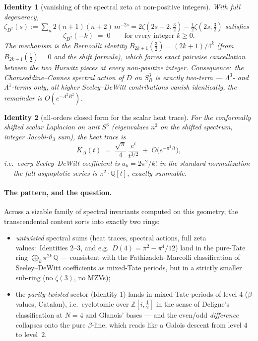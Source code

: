 \documentclass[11pt]{article}
\newtheorem{identity}{Identity}
\newcommand{\Q}{\mathbb{Q}}
\newcommand{\Z}{\mathbb{Z}}
\begin{document}
\begin{identity}[vanishing of the spectral zeta at non-positive
integers]
With full degeneracy, $\zeta_{D^2}(s) := \sum_{n} 2(n+1)(n+2)\,
m^{-2s} = 2\zeta(2s{-}2, \tfrac32) - \tfrac12 \zeta(2s, \tfrac32)$
satisfies
\begin{equation*}
  \zeta_{D^2}(-k) \;=\; 0 \qquad \text{for every integer } k \ge 0.
\end{equation*}
The mechanism is the Bernoulli identity $B_{2k+1}(\tfrac32) =
(2k{+}1)/4^k$ (from $B_{2k+1}(\tfrac12) = 0$ and the shift formula),
which forces exact pairwise cancellation between the two Hurwitz
pieces at every non-positive integer. Consequence:\ the
Chamseddine--Connes spectral action of $D$ on $S^3_R$ is
\emph{exactly two-term} --- $\Lambda^3$- and $\Lambda^1$-terms only,
all higher Seeley--DeWitt contributions vanish identically, the
remainder is $O(e^{-\Lambda^2 R^2})$.
\end{identity}

\begin{identity}[all-orders closed form for the scalar heat trace]
For the conformally shifted scalar Laplacian on unit $S^3$
(eigenvalues $n^2$ on the shifted spectrum, integer Jacobi-$\vartheta_3$
sum), the heat trace is
\begin{equation*}
  K_\Delta(t) \;=\; \frac{\sqrt{\pi}}{4}\,\frac{e^{t}}{t^{3/2}}
  \;+\; O\!\bigl(e^{-\pi^2/t}\bigr),
\end{equation*}
i.e.\ \emph{every} Seeley--DeWitt coefficient is
$a_k = 2\pi^2/k!$ in the standard normalization --- the full
asymptotic series is $\pi^2 \cdot \Q[t]$, exactly summable.
\end{identity}

\paragraph{The pattern, and the question.} Across a sizable family
of spectral invariants computed on this geometry, the transcendental
content sorts into exactly two rings:
\begin{itemize}
\item \emph{untwisted} spectral sums (heat traces, spectral actions,
full zeta values:\ Identities 2--3, and e.g.\
$D(4) = \pi^2 - \pi^4/12$) land in the pure-Tate ring
$\bigoplus_k \pi^{2k}\,\Q$ --- consistent with the
Fathizadeh--Marcolli classification of Seeley--DeWitt coefficients
as mixed-Tate periods, but in a strictly smaller sub-ring (no
$\zeta(3)$, no MZVs);
\item the \emph{parity-twisted} sector (Identity 1) lands in
mixed-Tate periods of level $4$ ($\beta$-values, Catalan), i.e.\
cyclotomic over $\Z[i, \tfrac12]$ in the sense of Deligne's
classification at $N = 4$ and Glanois' bases --- and the
even/odd \emph{difference} collapses onto the pure $\beta$-line,
which reads like a Galois descent from level $4$ to level~$2$.
\end{itemize}
\end{document}
